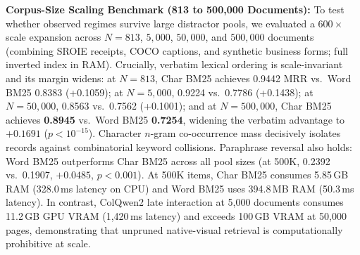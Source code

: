 \textbf{Corpus-Size Scaling Benchmark (813 to 500,000 Documents):}
To test whether observed regimes survive large distractor pools, we evaluated a $600\times$ scale expansion across $N=813$, $5{,}000$, $50{,}000$, and $500{,}000$ documents (combining SROIE receipts, COCO captions, and synthetic business forms; full inverted index in RAM). Crucially, verbatim lexical ordering is scale-invariant and its margin widens: at $N=813$, Char BM25 achieves 0.9442 MRR vs.\ Word BM25 0.8383 (+0.1059); at $N=5{,}000$, 0.9224 vs.\ 0.7786 (+0.1438); at $N=50{,}000$, 0.8563 vs.\ 0.7562 (+0.1001); and at $N=500{,}000$, Char BM25 achieves \textbf{0.8945} vs.\ Word BM25 \textbf{0.7254}, widening the verbatim advantage to $\mathbf{+0.1691}$ ($p < 10^{-15}$). Character $n$-gram co-occurrence mass decisively isolates records against combinatorial keyword collisions. Paraphrase reversal also holds: Word BM25 outperforms Char BM25 across all pool sizes (at 500K, 0.2392 vs.\ 0.1907, $+0.0485$, $p < 0.001$). At 500K items, Char BM25 consumes 5.85\,GB RAM (328.0\,ms latency on CPU) and Word BM25 uses 394.8\,MB RAM (50.3\,ms latency). In contrast, ColQwen2 late interaction at 5,000 documents consumes 11.2\,GB GPU VRAM (1,420\,ms latency) and exceeds 100\,GB VRAM at 50,000 pages, demonstrating that unpruned native-visual retrieval is computationally prohibitive at scale.

